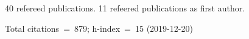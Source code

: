 40 refereed publications. 11 refeered publications as first author.

Total citations~=~879; h-index~=~15 (2019-12-20)
